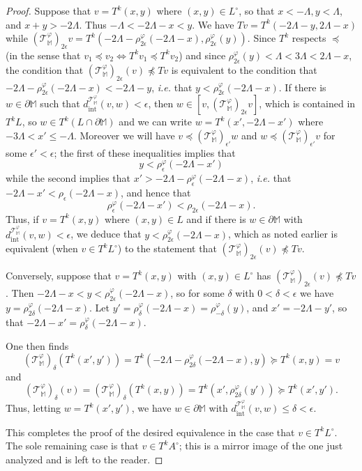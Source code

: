 \documentclass[11pt]{amsart}
\theoremstyle{definition}
\theoremstyle{remark}
\numberwithin{equation}{section}
\def\ep{\epsilon}
\begin{document}
\begin{proof}
	Suppose that $v=T^k(x,y)$ where $(x,y)\in L^{\circ}$, so that $x<-\Lambda, y<\Lambda$, and $x+y>-2\Lambda$.  Thus $-\Lambda<-2\Lambda-x<y$.  We have $Tv=T^k(-2\Lambda-y,2\Lambda-x)$ while $(\mathcal{T}_{\mathbb{M}}^{\varphi})_{2\ep}v=T^k\left(-2\Lambda-\rho_{2\ep}^{\varphi}(-2\Lambda-x),\rho_{2\ep}^{\varphi}(y)\right)$.  
	Since $T^k$ respects $\preceq$ (in the sense that $v_1\preceq v_2\Leftrightarrow T^kv_1\preceq T^kv_2$) and since $\rho_{2\ep}^{\varphi}(y)<\Lambda<3\Lambda<2\Lambda-x$, the condition that
		 $(\mathcal{T}_{\mathbb{M}}^{\varphi})_{2\ep}(v)\npreceq Tv$ is equivalent to the condition that $-2\Lambda-\rho_{2\ep}^{\varphi}(-2\Lambda-x)<-2\Lambda-y$, \emph{i.e.} that $y<\rho_{2\ep}^{\varphi}(-2\Lambda-x)$.  
If there is $w\in \partial \mathbb{M}$ such that $d_{\mathrm{int}}^{\mathcal{T}_{\mathbb{M}}^{\varphi}}(v,w)< \ep$, then $w\in [v,(\mathcal{T}_{\mathbb{M}}^{\varphi})_{2\ep}v]$, which is contained in $T^kL$, so $w\in T^k(L\cap \partial\mathbb{M})$ and we can write $w=T^k(x',-2\Lambda-x')$ where $-3\Lambda< x'\leq-\Lambda$.  Moreover we will have $v\preceq (\mathcal{T}_{\mathbb{M}}^{\varphi})_{\ep'}w$ and $w\preceq (\mathcal{T}_{\mathbb{M}}^{\varphi})_{\ep'}v$ for some $   \ep'<\ep$; the first of these inequalities implies that  \[ y<\rho_{\ep}^{\varphi}(-2\Lambda-x')\] while the second implies that $x'>-2\Lambda-\rho_{\ep}^{\varphi}(-2\Lambda-x)$, \emph{i.e.} that $-2\Lambda-x'<\rho_{\ep}(-2\Lambda-x)$, and hence that \[ \rho_{\ep}^{\varphi}(-2\Lambda-x')<\rho_{2\ep}(-2\Lambda-x).\]  Thus, if $v=T^k(x,y)$ where $(x,y)\in L$ and if there is $w\in\partial\mathbb{M}$ with $d_{\mathrm{int}}^{\mathcal{T}_{\mathbb{M}}^{\varphi}}(v,w)< \ep$, we deduce that $y<\rho_{2\ep}^{\varphi}(-2\Lambda-x)$, which as noted earlier is equivalent (when $v\in T^kL^{\circ}$) to the statement that $(\mathcal{T}_{\mathbb{M}}^{\varphi})_{2\ep}(v)\npreceq Tv$. 

Conversely, suppose that $v=T^k(x,y)$ with $(x,y)\in L^{\circ}$ has $(\mathcal{T}_{\mathbb{M}}^{\varphi})_{2\ep}(v)\npreceq Tv$. Then $-2\Lambda-x<y<\rho_{2\ep}^{\varphi}(-2\Lambda-x)$, so for some $\delta$ with $0<\delta<\ep$ we have $y=\rho_{2\delta}^{\varphi}(-2\Lambda-x)$.  Let $y'=\rho_{\delta}^{\varphi}(-2\Lambda-x)=\rho_{-\delta}^{\varphi}(y)$, and $x'=-2\Lambda-y'$, so that $-2\Lambda-x'=\rho_{\delta}^{\varphi}(-2\Lambda-x)$.  

One then finds \[ (\mathcal{T}_{\mathbb{M}}^{\varphi})_{\delta}(T^k(x',y'))=T^k\left(-2\Lambda-\rho_{2\delta}^{\varphi}(-2\Lambda-x),y\right)\succeq T^k(x,y)=v\] and \[ (\mathcal{T}_{\mathbb{M}}^{\varphi})_{\delta}(v)= (\mathcal{T}_{\mathbb{M}}^{\varphi})_{\delta}(T^k(x,y))=T^k(x',\rho_{2\delta}^{\varphi}(y'))\succeq T^k(x',y').\]  Thus, letting $w=T^k(x',y')$, we have $w\in\partial\mathbb{M}$ with  $d_{\mathrm{int}}^{\mathcal{T}_{\mathbb{M}}^{\varphi}}(v,w)\leq \delta< \ep$.  

This completes the proof of the desired equivalence in the case that $v\in T^kL^{\circ}$.  The sole remaining case is that $v\in T^kA^{\circ}$; this is a mirror image of the one just analyzed and is left to the reader.
 \end{proof}
\end{document}

